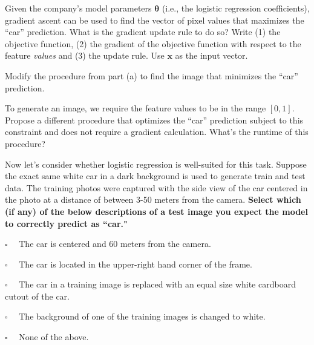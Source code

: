 \documentclass[11pt,addpoints,answers]{exam}
\newcommand{\emptysquare}{{\LARGE $\square$}\ \ }
\newcommand{\filledsquare}{{\LARGE $\boxtimes$}\ \ }
\newcommand{\xv}{\mathbf{x}}
\newcommand{\thetav     }{\boldsymbol \theta     }
\begin{document}
\begin{questions}
 
\question[2]  Given the company's model parameters $\thetav$ (i.e., the logistic regression coefficients), gradient ascent can be used to find the vector of pixel values that maximizes the ``car” prediction. What is the gradient update rule to do so? Write (1) the objective function, (2) the gradient of the objective function with respect to the feature \emph{values} and (3) the update rule. 
Use $\xv$ as the input vector. 

\begin{your_solution}[height=5cm]
\end{your_solution}


\question[1] Modify the procedure from part (a) to find the image that minimizes the “car” prediction.

\begin{your_solution}[title=Your Answer, height=7cm,width=15.3cm]
\end{your_solution}

\clearpage

\question[2] To generate an image, we require the feature values to be in the range $[0,1]$. Propose a different procedure that optimizes the “car” prediction subject to this constraint and does not require a gradient calculation. What’s the runtime of this procedure? 

\begin{your_solution}[height=5cm]
\end{your_solution}




\question[2] Now let's consider whether logistic regression is well-suited for this task. Suppose the exact same white car in a dark background is used to generate train and test data. The training photos were captured with the side view of the car centered in the photo at a distance of between 3-50 meters from the camera.  
\textbf{Select which (if any) of the below descriptions of a test image you expect the model to correctly predict as ``car."}
    \begin{list}{}
        \item 
            \emptysquare
            The car is centered and 60 meters from the camera.
        \item 
            \emptysquare
            The car is located in the upper-right hand corner of the frame.
        \item 
            \emptysquare
           The car in a training image is replaced with an equal size white cardboard cutout of the car.
        \item 
            \emptysquare
            The background of one of the training images is changed to white.
        \item 
            \emptysquare
            None of the above.
    \end{list}


\end{questions}
\end{document}
